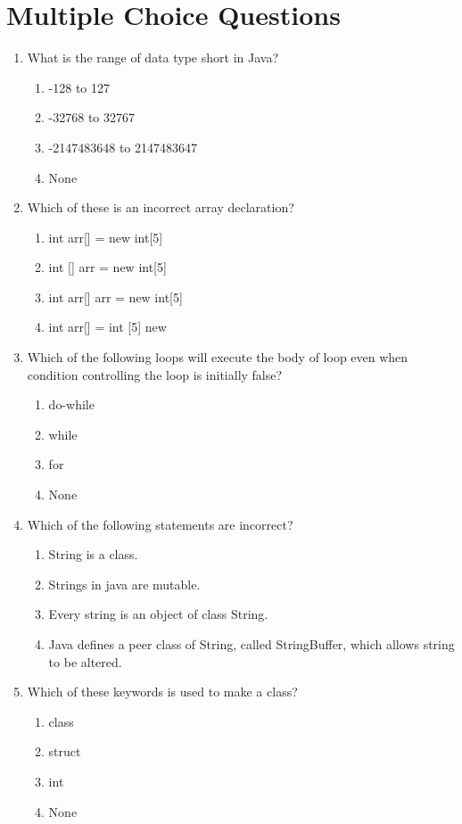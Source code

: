 \documentclass[11pt,a4paper]{article}
\begin{document}
\section*{Multiple Choice Questions}
\begin{enumerate}
    \item What is the range of data type short in Java?
        \begin{enumerate}
            \item -128 to 127
            \item -32768 to 32767
            \item -2147483648 to 2147483647
            \item None
        \end{enumerate}
    \item Which of these is an incorrect array declaration?
        \begin{enumerate}
            \item int arr[] = new int[5]
            \item int [] arr = new int[5]
            \item int arr[]
                arr = new int[5]
            \item int arr[] = int [5] new
        \end{enumerate}
    \item Which of the following loops will execute the body of loop even when condition controlling the loop is initially false?\begin{enumerate}
            \item do-while
            \item while
            \item for
            \item None
        \end{enumerate}
    \item Which of the following statements are incorrect?
        \begin{enumerate}
            \item String is a class.
            \item Strings in java are mutable.
            \item Every string is an object of class String.
            \item Java defines a peer class of String, called StringBuffer, which allows string to be altered.
                      \end{enumerate}
    \item Which of these keywords is used to make a class?
        \begin{enumerate}
            \item class
            \item struct
            \item int
            \item None
        \end{enumerate}
\end{enumerate}
\end{document}
